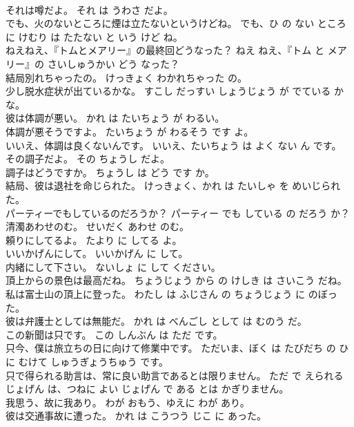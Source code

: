 \documentclass[8pt]{extreport}
\begin{document}
\begin{CJK}{UTF8}{min}
\\	それは噂だよ。	それ は うわさ だよ。	
\\	でも、火のないところに煙は立たないというけどね。	でも、ひ の ない ところ に けむり は たたない と いう けど ね。	
\\	ねえねえ、『トムとメアリー』の最終回どうなった？	ねえ ねえ、『トム と メアリー』の さいしゅうかい どう なった？	
\\	結局別れちゃったの。	けっきょく わかれちゃった の。	
\\	少し脱水症状が出ているかな。	すこし だっすい しょうじょう が でている かな。	
\\	彼は体調が悪い。	かれ は たいちょう が わるい。	
\\	体調が悪そうですよ。	たいちょう が わるそう です よ。	
\\	いいえ、体調は良くないんです。	いいえ、たいちょう は よく ない ん です。	
\\	その調子だよ。	その ちょうし だよ。	
\\	調子はどうですか。	ちょうし は どう です か。	
\\	結局、彼は退社を命じられた。	けっきょく、かれ は たいしゃ を めいじられた。	
\\	パーティーでもしているのだろうか？	パーティー でも している の だろう か？	
\\	清濁あわせのむ。	せいだく あわせ のむ。	
\\	頼りにしてるよ。	たより に してる よ。	
\\	いいかげんにして。	いいかげん に して。	
\\	内緒にして下さい。	ないしょ に して ください。	
\\	頂上からの景色は最高だね。	ちょうじょう から の けしき は さいこう だね。	
\\	私は富士山の頂上に登った。	わたし は ふじさん の ちょうじょう に のぼった。	
\\	彼は弁護士としては無能だ。	かれ は べんごし として は むのう だ。	
\\	この新聞は只です。	この しんぶん は ただ です。	
\\	只今、僕は旅立ちの日に向けて修業中です。	ただいま、ぼく は たびだち の ひ に むけて しゅうぎょうちゅう です。	
\\	只で得られる助言は、常に良い助言であるとは限りません。	ただ で えられる じょげん は、つねに よい じょげん で ある とは かぎりません。	
\\	我思う、故に我あり。	わが おもう、ゆえに わが あり。	
\\	彼は交通事故に遭った。	かれ は こうつう じこ に あった。	

\end{CJK}
\end{document}
